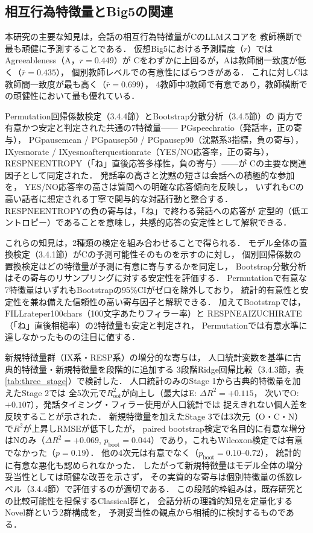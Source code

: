 \documentclass[dvipdfmx,11pt,a4paper]{bxjsarticle}
\renewcommand{\_}{\paperorigunderscore\allowbreak}%
\begin{document}
\subsection{相互行為特徴量とBig5の関連}

本研究の主要な知見は，会話の相互行為特徴量がCのLLMスコアを
教師横断で最も頑健に予測することである．
仮想Big5における予測精度（$r$）ではAgreeableness（A，$r = 0.449$）が
Cをわずかに上回るが，Aは教師間一致度が低く（$\bar{r} = 0.435$），
個別教師レベルでの有意性にばらつきがある．
これに対しCは教師間一致度が最も高く（$\bar{r} = 0.699$），
4教師中3教師で有意であり，教師横断での頑健性において最も優れている．

Permutation回帰係数検定（3.4.4節）とBootstrap分散分析（3.4.5節）の
両方で有意かつ安定と判定された共通の7特徴量——
PG\_speech\_ratio（発話率，正の寄与），
PG\_pause\_mean / PG\_pause\_p50 / PG\_pause\_p90（沈黙系3指標，負の寄与），
IX\_yesno\_rate / IX\_yesno\_after\_question\_rate（YES/NO応答率，正の寄与），
RESP\_NE\_ENTROPY（「ね」直後応答多様性，負の寄与）——が
Cの主要な関連因子として同定された．
発話率の高さと沈黙の短さは会話への積極的な参加を，
YES/NO応答率の高さは質問への明確な応答傾向を反映し，
いずれもCの高い話者に想定される丁寧で関与的な対話行動と整合する．
RESP\_NE\_ENTROPYの負の寄与は，「ね」で終わる発話への応答が
定型的（低エントロピー）であることを意味し，共感的応答の安定性として解釈できる．

これらの知見は，2種類の検定を組み合わせることで得られる．
モデル全体の置換検定（3.4.1節）がCの予測可能性そのものを示すのに対し，
個別回帰係数の置換検定はどの特徴量が予測に有意に寄与するかを同定し，
Bootstrap分散分析はその寄与のリサンプリングに対する安定性を評価する．
Permutationで有意な7特徴量はいずれもBootstrapの95\%CIがゼロを除外しており，
統計的有意性と安定性を兼ね備えた信頼性の高い寄与因子と解釈できる．
加えてBootstrapでは，FILL\_rate\_per\_100chars（100文字あたりフィラー率）と
RESP\_NE\_AIZUCHI\_RATE（「ね」直後相槌率）の2特徴量も安定と判定され，
Permutationでは有意水準に達しなかったものの注目に値する．

新規特徴量群（IX系・RESP系）の増分的な寄与は，
人口統計変数を基準に古典的特徴量・新規特徴量を段階的に追加する
3段階Ridge回帰比較（3.4.3節，表\ref{tab:three_stage}）で検討した．
人口統計のみのStage 1から古典的特徴量を加えたStage 2では
全5次元で$R^2_{\text{oof}}$が向上し（最大はE: $\Delta R^2 = +0.115$，
次いでO: $+0.107$），発話タイミング・フィラー使用が人口統計では
捉えきれない個人差を反映することが示された．
新規特徴量を加えたStage 3では3次元（O・C・N）で$R^2$が上昇しRMSEが低下したが，
paired bootstrap検定で名目的に有意な増分はNのみ（$\Delta R^2 = +0.069$,
$p_{\text{boot}} = 0.044$）であり，これもWilcoxon検定では有意でなかった（$p = 0.19$）．
他の4次元は有意でなく（$p_{\text{boot}} = 0.10$--$0.72$），
統計的に有意な悪化も認められなかった．
したがって新規特徴量はモデル全体の増分妥当性としては頑健な改善を示さず，
その実質的な寄与は個別特徴量の係数レベル（3.4.4節）で評価するのが適切である．
この段階的枠組みは，既存研究との比較可能性を担保するClassical群と，
会話分析の理論的知見を定量化するNovel群という2群構成を，
予測妥当性の観点から相補的に検討するものである．
\end{document}
